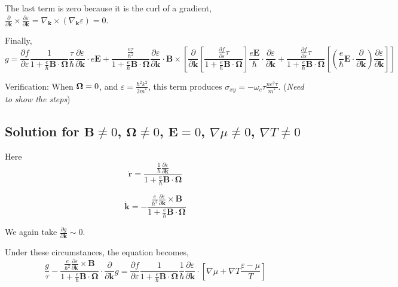 \documentclass[aps,amsmath,prl]{revtex4-2}
\newcommand{\bvec}[1]{{\mathbf #1}}
\renewcommand\vec[1]{\ensuremath\boldsymbol{#1}} %
\begin{document}
 The last term is zero because it is the curl of a gradient, $\frac{\partial }{\partial \bvec{k}} \times \frac{\partial \varepsilon}{\partial \bvec{k}} = \nabla_\bvec{k} \times (\nabla_\bvec{k} \varepsilon) = 0$.
 
 Finally,
\begin{equation}\label{Eq:gnonzeroE}
 g = \frac{\partial f} {\partial \varepsilon}\frac{1}{1 + \frac{e}{\hbar} \bvec{B}\cdot\bvec{\Omega}}
 \frac{\tau}{\hbar} \frac{\partial \varepsilon}{\partial \bvec{k}}\cdot e \bvec{E} + \frac{\frac{e \tau}{\hbar^2} }{1 + \frac{e}{\hbar} \bvec{B}\cdot\bvec{\Omega}} \frac{\partial \varepsilon}{\partial \bvec{k}} \cdot \bvec{B} \times \left[ \frac{\partial}{\partial \bvec{k}} \left[ \frac{\frac{\partial f} {\partial \varepsilon} \tau}{1 + \frac{e}{\hbar} \bvec{B}\cdot\bvec{\Omega}}
 \right] \frac{e \bvec{E}}{\hbar} \cdot \frac{\partial \varepsilon}{\partial \bvec{k}} + \frac{\frac{\partial f} {\partial \varepsilon} \tau}{1 + \frac{e}{\hbar} \bvec{B}\cdot\bvec{\Omega}} \left[(\frac{e}{\hbar} \bvec{E}\cdot \frac{\partial }{\partial \bvec{k}} )\frac{\partial \varepsilon}{\partial \bvec{k}} \right] \right]
 \end{equation}
 
Verification: When $\vec{\Omega} = 0$, and $\varepsilon = \frac{\hbar^2 k^2}{2 m^*}$, this term produces $\sigma_{xy} = -\omega_c \tau \frac{n e^2 \tau}{m^*}$.
(\textit{Need to show the steps})

\subsection{Solution for $\bvec{B}\neq0$, $\bvec{\Omega}\neq 0$, $\bvec{E} = 0$, $\nabla \mu \neq 0$, $\nabla T \neq 0$}

Here \begin{equation}
\dot{\bvec{r}} = \frac{\frac{1}{\hbar} \frac{\partial \varepsilon}{\partial \bvec{k}}}{1 + \frac{e}{\hbar} \bvec{B}\cdot\bvec{\Omega}}
\end{equation}

\begin{equation}
\dot{\bvec{k}} = -\frac{\frac{e}{\hbar^2} \frac{\partial \varepsilon}{\partial \bvec{k}} \times \bvec{B}}{1 + \frac{e}{\hbar} \bvec{B}\cdot\bvec{\Omega}}
\end{equation}

We again take $\frac{\partial g}{\partial \bvec{k}} \sim 0$.

Under these circumstances, the equation becomes,
$$
\frac{g}{\tau} -\frac{\frac{e}{\hbar^2} \frac{\partial \varepsilon}{\partial \bvec{k}} \times \bvec{B}}{1 + \frac{e}{\hbar} \bvec{B}\cdot\bvec{\Omega}} \cdot\frac{\partial}{\partial \bvec{k}} g = \frac{\partial f}{\partial \varepsilon}\frac{1}{1 + \frac{e}{\hbar} \bvec{B}\cdot\bvec{\Omega}}
\frac{1}{\hbar} \frac{\partial \varepsilon}{\partial \bvec{k}}\cdot\left[ \nabla{\mu} + \nabla T \frac{\varepsilon - \mu}{T}\right] $$
\end{document}
